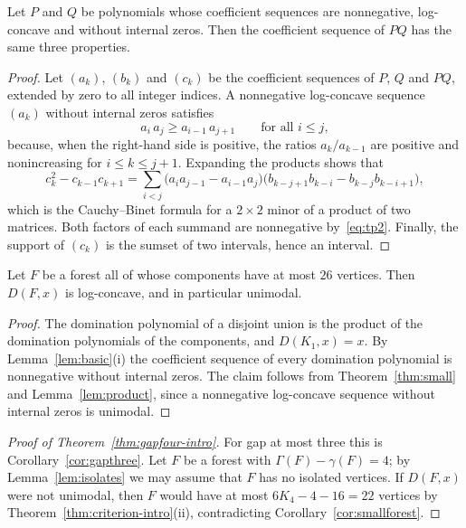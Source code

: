 \documentclass[smallextended,envcountsect,envcountsame]{svjour3}
\newcommand{\MaxLC}{26}
\begin{document}
\begin{lemma}\label{lem:product}
Let $P$ and $Q$ be polynomials whose coefficient sequences are nonnegative,
log-concave and without internal zeros. Then the coefficient sequence of
$PQ$ has the same three properties.
\end{lemma}

\begin{proof}
Let $(a_k)$, $(b_k)$ and $(c_k)$ be the coefficient sequences of $P$, $Q$ and
$PQ$, extended by zero to all integer indices. A nonnegative log-concave
sequence $(a_k)$ without internal zeros satisfies
\begingroup\small\begin{equation}\label{eq:tp2}
  a_i\,a_j\ge a_{i-1}\,a_{j+1}\qquad\text{for all } i\le j ,
\end{equation}\endgroup
because, when the right-hand side is positive, the ratios $a_k/a_{k-1}$ are
positive and nonincreasing for $i\le k\le j+1$. Expanding the products shows
that
\begingroup\small\[
  c_k^2-c_{k-1}c_{k+1}=\sum_{i<j}
  \bigl(a_i a_{j-1}-a_{i-1}a_j\bigr)\bigl(b_{k-j+1}b_{k-i}-b_{k-j}b_{k-i+1}\bigr),
\]\endgroup
which is the Cauchy--Binet formula for a $2\times2$ minor of a product of two
matrices. Both factors of each summand are nonnegative by~\eqref{eq:tp2}.
Finally, the support of $(c_k)$ is the sumset of two intervals, hence an
interval.
\end{proof}

\begin{corollary}\label{cor:smallforest}
Let $F$ be a forest all of whose components have at most $\MaxLC$ vertices.
Then $D(F,x)$ is log-concave, and in particular unimodal.
\end{corollary}

\begin{proof}
The domination polynomial of a disjoint union is the product of the
domination polynomials of the components, and $D(K_1,x)=x$. By
Lemma~\ref{lem:basic}(i) the coefficient sequence of every domination
polynomial is nonnegative without internal zeros. The claim follows from
Theorem~\ref{thm:small} and Lemma~\ref{lem:product}, since a nonnegative
log-concave sequence without internal zeros is unimodal.
\end{proof}

\begin{proof}[Proof of Theorem~\ref{thm:gapfour-intro}]
For gap at most three this is Corollary~\ref{cor:gapthree}. Let $F$ be a
forest with $\Gamma(F)-\gamma(F)=4$; by Lemma~\ref{lem:isolates} we may
assume that $F$ has no isolated vertices. If $D(F,x)$ were not unimodal,
then $F$ would have at most $6K_4-4-16=22$ vertices by
Theorem~\ref{thm:criterion-intro}(ii), contradicting
Corollary~\ref{cor:smallforest}.
\end{proof}
\end{document}
